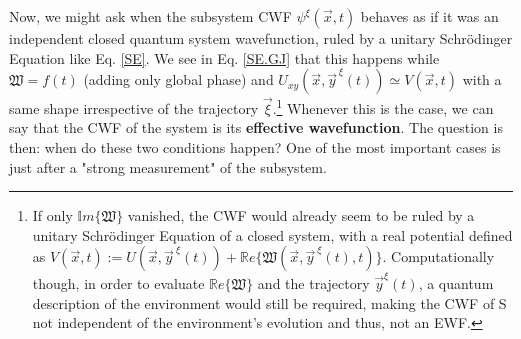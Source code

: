 \documentclass[11pt, a4paper]{article} %
\newcommand{\R}{\mathbb{R}} %
\begin{document}
Now, we might ask when the subsystem CWF $\psi^\xi(\vec{x},t)$ behaves as if it was an independent closed quantum system wavefunction, ruled by a unitary Schrödinger Equation like Eq. \eqref{SE}. We see in Eq. \eqref{SE.GJ} that this happens while $\mathfrak{W}=f(t)$ (adding only global phase) and $U_{xy}(\vec{x},\vec{y}^{\,\xi}(t))\simeq V(\vec{x},t)$ with a same shape irrespective of the trajectory $\vec{\xi}$.\footnote{ If only $\mathbb{I}m\{\mathfrak{W}\}$ vanished, the CWF would already seem to be ruled by a unitary Schrödinger Equation of a closed system, with a real potential defined as $V(\vec{x},t):=U(\vec{x},\vec{y}^{\:\xi}(t))+\R e\{\mathfrak{W}(\vec{x},\vec{y}^{\:\xi}(t),t)\}$. Computationally though, in order to evaluate $\R e\{\mathfrak{W}\}$ and the trajectory $\vec{y}^\xi(t)$, a quantum description of the environment would still be required, making the CWF of S not independent of the environment's evolution and thus, not an EWF. } Whenever this is the case, we can say that the CWF of the system is its {\bf effective wavefunction}. The question is then: when do these two conditions happen? One of the most important cases is just after a "strong measurement" of the subsystem. 
\end{document}
